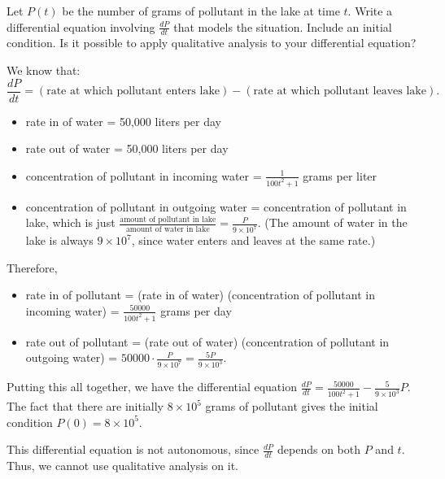 \documentclass[main]{subfiles}
\begin{document}
\begin{enumerate}
\begin{problem}[3in]
      Let $P(t)$ be the
      number of grams of pollutant in the lake at time $t$.  Write a
      differential equation involving $\frac{dP}{dt}$ that models the
      situation.  Include an initial condition. Is it possible to apply qualitative analysis to your differential equation?
          \end{problem}

    \begin{solution}
     We know that:
      \[ \frac{dP}{dt} = (\textrm{rate at which pollutant enters lake}) -
      (\textrm{rate at which pollutant leaves lake}).\]
      \begin{itemize}
      \item rate in of water = 50,000 liters per day      
      \item rate out of water = 50,000 liters per day
      \item concentration of pollutant in incoming water = $\displaystyle
        \frac{1}{100t^2 + 1}$ grams per liter
      \item concentration of pollutant in outgoing water = concentration of
        pollutant in lake, which is just $\displaystyle \frac{\textrm{amount
            of pollutant in lake}}{\textrm{amount of water in lake}} =
        \frac{P}{9 \times 10^7}$.  (The amount of water in the lake is
        always $9 \times 10^7$, since water enters and leaves at the same
        rate.) 
      \end{itemize}
      Therefore,
      \begin{itemize}
      \item rate in of pollutant = (rate in of water) (concentration of
        pollutant in incoming water) = $\displaystyle \frac{50000}{100t^2 +
          1}$ grams per day
      \item rate out of pollutant = (rate out of water) (concentration of
        pollutant in outgoing water) = $\displaystyle 50000 \cdot \frac{P}{9
          \times 10^7} = \frac{5P}{9 \times 10^3}$. 
      \end{itemize}
      Putting this all together, we have the differential equation
      $\boxed{\frac{dP}{dt} = \frac{50000}{100t^2 + 1} - \frac{5}{9 \times
          10^3} P}$.  The fact that there are initially $8 \times 10^5$
      grams of pollutant gives the initial condition $\boxed{P(0) = 8 \times
        10^5}$. 
        
        This differential equation is not autonomous, since $\frac{dP}{dt}$ depends on both $P$ and $t$. Thus, we cannot use qualitative analysis on it.
    \end{solution}


\end{enumerate}
\end{document}
